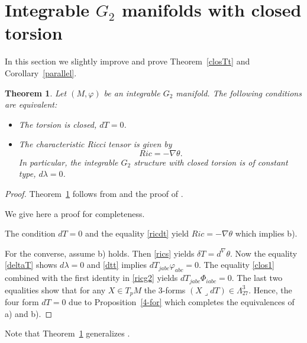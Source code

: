 \documentclass[10pt,british]{article}
\newtheorem{thrm}{Theorem}[section]
\def\sb {{\nabla}}
\def\p{{\varphi}}
\begin{document}
\section{Integrable $G_2$ manifolds with closed torsion}
In this section we slightly improve  \cite[Theorem~5.1]{FI} and prove Theorem~\ref{closTt} and Corollary~\ref{parallel}. 
\begin{thrm}\label{closT}
Let $(M,\p)$ be  an integrable $G_2$ manifold. The following conditions are equivalent:
\begin{itemize}
\item[a).] The torsion is closed, $dT=0$.
\item[b).] The characteristic Ricci tensor is given by
\begin{equation}\label{clos1}Ric=-\sb\theta.
\end{equation}
 In particular, the integrable $G_2$ structure with closed torsion is of constant type, $d\lambda=0$.
\end{itemize}
\end{thrm}
\begin{proof}
Theorem~\ref{closT} follows from  \cite[Theorem~5.1]{FI} and the proof of  \cite[Theorem~5.4]{FI}. 

We give here a proof for completeness.

The condition $dT=0$ and  the equality \eqref{ricdt} yield $Ric=-\sb\theta$ which  implies b).

For the converse, assume b) holds. Then  \eqref{rics} yields 
$%
\delta T=d^{\nabla}\theta.
$ %
  Now the equality \eqref{deltaT} shows $d\lambda=0$ and \eqref{dtt} implies $dT_{jabc}\p_{abc}=0.$ 
The equality   \eqref{clos1} combined with the first identity in  \eqref{ricg2} yields $dT_{jabc}\Phi_{iabc}=0.$
The last two equalities  show that for any $X\in T_pM$ the 3-forms $(X\lrcorner dT)\in \Lambda^3_{27}$. Hence, the four form $dT=0$ due to Proposition~\ref{4-for} which completes the equivalences of a) and b).
\end{proof}
Note that Theorem~\ref{closT}  generalizes \cite[Proposition~4.10]{Wit}.

\end{document}
